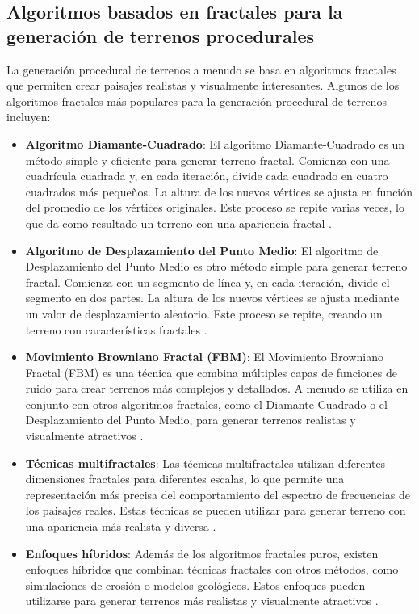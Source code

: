 \subsection{Algoritmos basados en fractales para la generación de terrenos procedurales}

La generación procedural de terrenos a menudo se basa en algoritmos fractales que permiten crear paisajes realistas y visualmente interesantes. Algunos de los algoritmos fractales más populares para la generación procedural de terrenos incluyen:

\begin{itemize}
    \item \textbf{Algoritmo Diamante-Cuadrado}: El algoritmo Diamante-Cuadrado es un método simple y eficiente para generar terreno fractal. Comienza con una cuadrícula cuadrada y, en cada iteración, divide cada cuadrado en cuatro cuadrados más pequeños. La altura de los nuevos vértices se ajusta en función del promedio de los vértices originales. Este proceso se repite varias veces, lo que da como resultado un terreno con una apariencia fractal \cite{DiamanteCuadrado}.
    
    \item \textbf{Algoritmo de Desplazamiento del Punto Medio}: El algoritmo de Desplazamiento del Punto Medio es otro método simple para generar terreno fractal. Comienza con un segmento de línea y, en cada iteración, divide el segmento en dos partes. La altura de los nuevos vértices se ajusta mediante un valor de desplazamiento aleatorio. Este proceso se repite, creando un terreno con características fractales \cite{DesplazamientoPuntoMedio}.
    
    \item \textbf{Movimiento Browniano Fractal (FBM)}: El Movimiento Browniano Fractal (FBM) es una técnica que combina múltiples capas de funciones de ruido para crear terrenos más complejos y detallados. A menudo se utiliza en conjunto con otros algoritmos fractales, como el Diamante-Cuadrado o el Desplazamiento del Punto Medio, para generar terrenos realistas y visualmente atractivos \cite{FractalBrownianoMotion}.
    
    \item \textbf{Técnicas multifractales}: Las técnicas multifractales utilizan diferentes dimensiones fractales para diferentes escalas, lo que permite una representación más precisa del comportamiento del espectro de frecuencias de los paisajes reales. Estas técnicas se pueden utilizar para generar terreno con una apariencia más realista y diversa \cite{TecnicasMultifractales}.
    
    \item \textbf{Enfoques híbridos}: Además de los algoritmos fractales puros, existen enfoques híbridos que combinan técnicas fractales con otros métodos, como simulaciones de erosión o modelos geológicos. Estos enfoques pueden utilizarse para generar terrenos más realistas y visualmente atractivos \cite{EnfoquesHibridos}.
\end{itemize}

